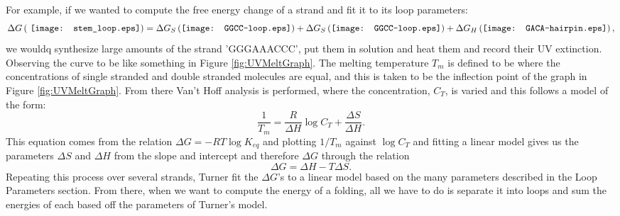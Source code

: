 For example, if we wanted to compute the free energy change of a
strand and fit it to its loop parameters:
\begin{equation}
\Delta G \left ( \vcenter{\hbox{ \texttt{[image: stem\_loop.eps]}}}
 \right ) =
\Delta G_S \left ( \vcenter{\hbox{\texttt{[image: GGCC-loop.eps]}}}
\right ) +
\Delta G_S \left ( \vcenter{\hbox{\texttt{[image: GGCC-loop.eps]}}}
\right ) + 
\Delta G_H \left (\vcenter{\hbox{\texttt{[image: GACA-hairpin.eps]}}}
\right ),
\end{equation}
we wouldq synthesize large amounts of the strand 'GGGAAACCC', put them
in solution and heat them and record their UV extinction. Observing
the curve to be like something in Figure \ref{fig:UVMeltGraph}. The
melting temperature $T_m$ is defined to be where the concentrations of
single stranded and double stranded molecules are equal, and this is
taken to be the inflection point of the graph in Figure
\ref{fig:UVMeltGraph}. From there Van't Hoff analysis is performed,
where the concentration, $C_T$, is varied and this follows a model of
the form:
\begin{equation}
  \frac{1}{T_m} = \frac{R}{\Delta H} \log{C_T} + \frac{\Delta S}{\Delta H}.
\end{equation}
This equation comes from the relation $\Delta G = -RT \log{K_{eq}}$
and plotting $1/T_m$ against $\log{C_T}$ and fitting a linear model
gives us the parameters $\Delta S$ and $\Delta H$ from the slope and
intercept and therefore $\Delta G$ through the relation
\begin{equation}
\Delta G = \Delta H - T \Delta S.
\end{equation}
Repeating this process over several strands, Turner fit the $\Delta
G$'s to a linear model based on the many parameters described in the
Loop Parameters section. From there, when we want to compute the
energy of a folding, all we have to do is separate it into loops and
sum the energies of each based off the parameters of Turner's model.


%
%

